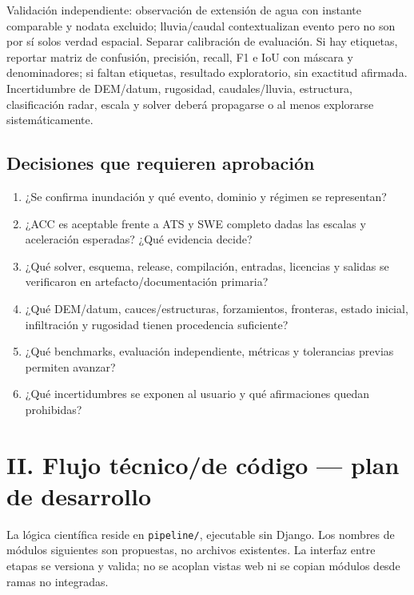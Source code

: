 \documentclass[11pt,a4paper]{article}
\begin{document}
Validación independiente: observación de extensión de agua con instante comparable y nodata excluido; lluvia/caudal contextualizan evento pero no son por sí solos verdad espacial. Separar calibración de evaluación. Si hay etiquetas, reportar matriz de confusión, precisión, recall, F1 e IoU con máscara y denominadores; si faltan etiquetas, resultado exploratorio, sin exactitud afirmada. Incertidumbre de DEM/datum, rugosidad, caudales/lluvia, estructura, clasificación radar, escala y solver deberá propagarse o al menos explorarse sistemáticamente.

\subsection{Decisiones que requieren aprobación}
\begin{enumerate}
\item ¿Se confirma inundación y qué evento, dominio y régimen se representan?
\item ¿ACC es aceptable frente a ATS y SWE completo dadas las escalas y aceleración esperadas? ¿Qué evidencia decide?
\item ¿Qué solver, esquema, release, compilación, entradas, licencias y salidas se verificaron en artefacto/documentación primaria?
\item ¿Qué DEM/datum, cauces/estructuras, forzamientos, fronteras, estado inicial, infiltración y rugosidad tienen procedencia suficiente?
\item ¿Qué benchmarks, evaluación independiente, métricas y tolerancias previas permiten avanzar?
\item ¿Qué incertidumbres se exponen al usuario y qué afirmaciones quedan prohibidas?
\end{enumerate}

\section{II. Flujo técnico/de código --- plan de desarrollo}
La lógica científica reside en \texttt{pipeline/}, ejecutable sin Django. Los nombres de módulos siguientes son propuestas, no archivos existentes. La interfaz entre etapas se versiona y valida; no se acoplan vistas web ni se copian módulos desde ramas no integradas.
\end{document}
